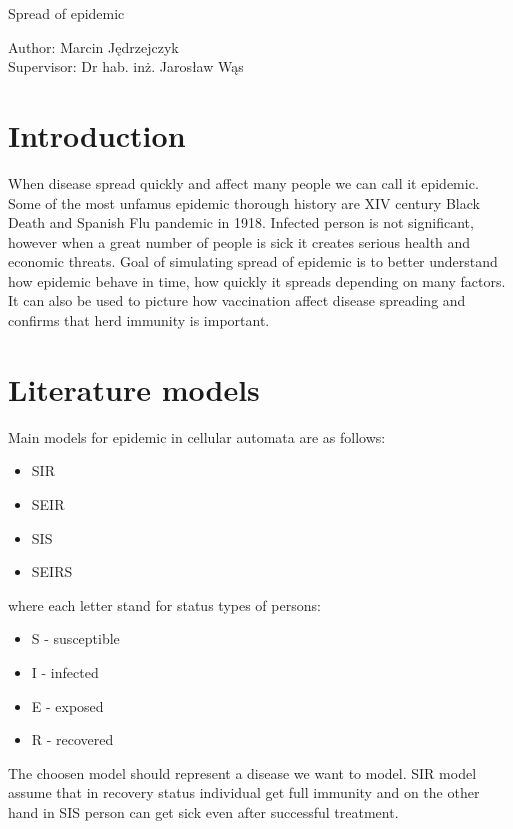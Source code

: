 \documentclass[a4paper, 11pt]{article}
\begin{document}
\renewcommand\refname{Bibliography}
	\begin{center}
			\begin{LARGE}
			Spread of epidemic\\[1cm]
		    \end{LARGE}
	    	\begin{Large}
	    		Author: Marcin Jędrzejczyk \\
	    		Supervisor: Dr hab. inż. Jarosław Wąs\\[3cm]
	    	\end{Large}
	\end{center}

	\section{Introduction}
	When disease spread quickly and affect many people we can call it epidemic. Some of the most unfamus epidemic thorough history are XIV century Black Death and Spanish  Flu pandemic in 1918. Infected person is not significant, however when a great number of people is sick it creates serious health and economic threats. Goal of simulating spread of epidemic is to better understand how epidemic behave in time, how quickly it spreads depending on many factors.\cite{WHITE} It can also be used to picture how vaccination affect disease spreading and confirms that herd immunity is important.
	\section{Literature models}
	Main models for epidemic in cellular automata are as follows:\\
	\begin{itemize}
		\item SIR
		\item SEIR
		\item SIS
		\item SEIRS	
	\end{itemize}
	where each letter stand for status types of persons:
	\begin{itemize}
		\item S - susceptible 
		\item I - infected 
		\item E - exposed
		\item R - recovered
	\end{itemize}
	The choosen model should represent a disease we want to model. SIR model assume that in recovery status individual get full immunity and on the other hand in SIS person can get sick even after successful treatment.\cite{WHITE}\\
	
\end{document}
